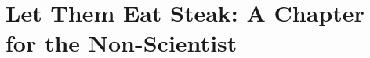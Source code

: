 
\glsresetall

\newcommand{\narr}{\noindent Narrator:\\}


\newenvironment{shadequote}[1][]{%
    \ignorespaces%
    \begin{mdframed}[style=MyShadeQuoteStyle,#1]%
}{%
    \end{mdframed}%
    \ignorespacesafterend%
}%

\chapter{Let Them Eat Steak: A Chapter for the Non-Scientist}
\label{ch:public}

